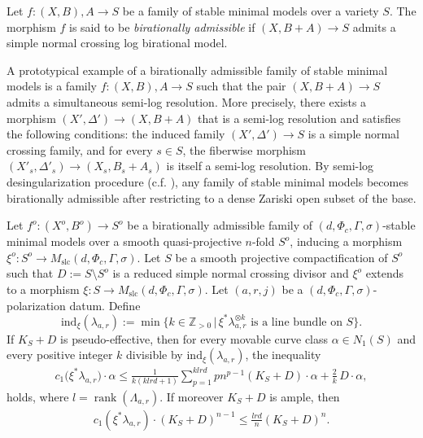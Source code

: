 \documentclass[11pt,letterpaper]{amsart}
\numberwithin{equation}{section}
\begin{document}
	\begin{defn}\label{defn_admissible}
		Let $f: (X, B), A \to S$ be a family of stable minimal models over a variety $S$. The morphism $f$ is said to be \emph{birationally admissible} if $(X, B + A) \to S$ admits a simple normal crossing log birational model.
	\end{defn}
	A prototypical example of a birationally admissible family of stable minimal models is a family $f \colon (X, B), A \to S$ such that the pair $(X, B + A) \to S$ admits a simultaneous semi-log resolution. More precisely, there exists a morphism $(X', \Delta') \to (X, B + A)$ that is a semi-log resolution and satisfies the following conditions: the induced family $(X', \Delta') \to S$ is a simple normal crossing family, and for every $s \in S$, the fiberwise morphism $(X'_s, \Delta'_s) \to (X_s, B_s + A_s)$ is itself a semi-log resolution. By semi-log desingularization procedure (c.f. \cite{Bierstone2013}), any family of stable minimal models becomes birationally admissible after restricting to a dense Zariski open subset of the base.
	\begin{thm}\label{thm_Arakelov_family}
		Let $f^o \colon (X^o, B^o) \to S^o$ be a birationally admissible family of $(d, \Phi_c, \Gamma, \sigma)$-stable minimal models over a smooth quasi-projective $n$-fold $S^o$, inducing a morphism $\xi^o \colon S^o \to M_{\mathrm{slc}}(d, \Phi_c, \Gamma, \sigma)$. Let $S$ be a smooth projective compactification of $S^o$ such that $D := S \setminus S^o$ is a reduced simple normal crossing divisor and $\xi^o$ extends to a morphism $\xi \colon S \to M_{\mathrm{slc}}(d, \Phi_c, \Gamma, \sigma)$. Let $(a,r,j)$ be a $(d, \Phi_c, \Gamma, \sigma)$-polarization datum. Define  
		\[
		\mathrm{ind}_\xi(\lambda_{a,r}) := \min\big\{k \in \mathbb{Z}_{>0} \,\big|\, \xi^*\lambda_{a,r}^{\otimes k} \text{ is a line bundle on } S \big\}.
		\]  
		If $K_S + D$ is pseudo-effective, then for every movable curve class $\alpha \in N_1(S)$ and every positive integer $k$ divisible by $\mathrm{ind}_\xi(\lambda_{a,r})$, the inequality  
		\begin{align}\label{align_Ara_1}
			c_1\big(\xi^*\lambda_{a,r}\big) \cdot \alpha 
			\leq \frac{1}{k(k l r d + 1)} \sum_{p=1}^{k l r d} p n^{p-1} (K_S + D) \cdot \alpha + \frac{2}{k}\, D \cdot \alpha,
		\end{align}  
		holds, where $l = \operatorname{rank}(\Lambda_{a,r})$.
		If moreover $K_S+D$ is ample, then  
		\begin{align}\label{align_Ara_2}
			c_1(\xi^*\lambda_{a,r})\cdot(K_S+D)^{n-1} \leq \frac{lrd}{n}(K_S+D)^{n}.
		\end{align}
	\end{thm}
\end{document}
